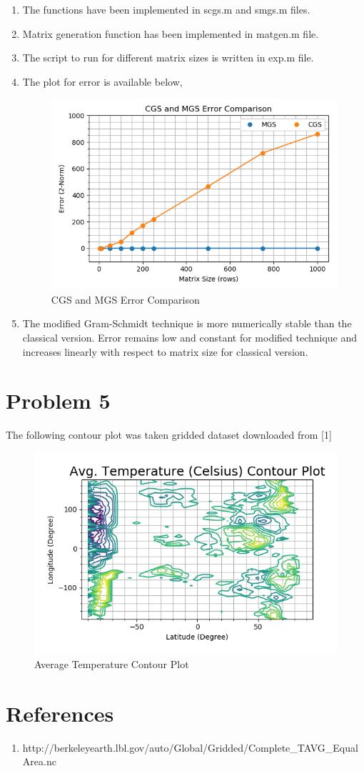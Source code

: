 \documentclass[12pt,letterpaper]{article}
\begin{document}
\begin{enumerate}
	\item The functions have been implemented in scgs.m and smgs.m files.
	\item Matrix generation function has been implemented in matgen.m file.
	\item The script to run for different matrix sizes is written in exp.m file.
	\item The plot for error is available below,
	\begin{figure}[!h]
		\centering
		\includegraphics[width=0.9\linewidth]{1.png}
		\caption{CGS and MGS Error Comparison}
	\end{figure}
	\item The modified Gram-Schmidt technique is more numerically stable than the classical version. Error remains low and constant for modified technique and increases linearly with respect to matrix size for classical version.
\end{enumerate}

\section*{Problem 5}

The following contour plot was taken gridded dataset downloaded from [1]

\begin{figure}[!h]
	\centering
	\includegraphics[width=0.9\linewidth]{2.png}
	\caption{Average Temperature Contour Plot}
\end{figure}
  
\section*{References}

\begin{enumerate}
	\item http://berkeleyearth.lbl.gov/auto/Global/Gridded/Complete\_TAVG\_EqualArea.nc
\end{enumerate}
\end{document}
